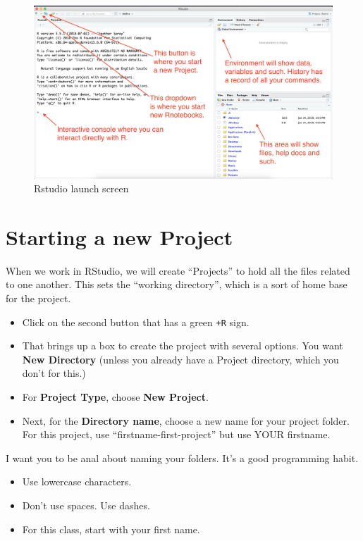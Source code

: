 \documentclass[]{book}
\providecommand{\tightlist}{%
  \setlength{\itemsep}{0pt}\setlength{\parskip}{0pt}}
\begin{document}
\begin{figure}
\centering
\includegraphics[width=6.25000in]{_images/02-rstudio-start.png}
\caption{Rstudio launch screen}
\end{figure}

\section{Starting a new Project}\label{starting-a-new-project}

When we work in RStudio, we will create ``Projects'' to hold all the
files related to one another. This sets the ``working directory'', which
is a sort of home base for the project.

\begin{itemize}
\tightlist
\item
  Click on the second button that has a green \texttt{+R} sign.
\item
  That brings up a box to create the project with several options. You
  want \textbf{New Directory} (unless you already have a Project
  directory, which you don't for this.)
\item
  For \textbf{Project Type}, choose \textbf{New Project}.
\item
  Next, for the \textbf{Directory name}, choose a new name for your
  project folder. For this project, use ``firstname-first-project'' but
  use YOUR firstname.
\end{itemize}

I want you to be anal about naming your folders. It's a good programming
habit.

\begin{itemize}
\tightlist
\item
  Use lowercase characters.
\item
  Don't use spaces. Use dashes.
\item
  For this class, start with your first name.
\end{itemize}
\end{document}
